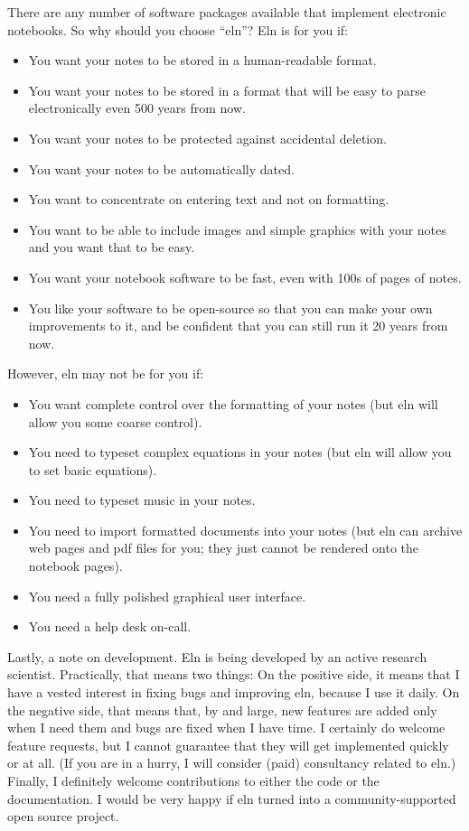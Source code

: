 \documentclass[11pt]{report}
\begin{document}
There are any
number of software packages available that implement electronic
notebooks. So why should you choose ``eln''? Eln is for you if:
\begin{itemize}
  \item You want your notes to be stored in a human-readable format.
  \item You want your notes to be stored in a format that will be easy to
    parse electronically even 500 years from now.
  \item You want your notes to be protected against accidental
    deletion.
  \item You want your notes to be automatically dated.
  \item You want to concentrate on entering text and not on
    formatting.
  \item You want to be able to include images and simple graphics with
    your notes and you want that to be easy.
  \item You want your notebook software to be fast, even with 100s
    of pages of notes.
  \item You like your software to be open-source so that you can make
    your own improvements to it, and be confident that you can still
    run it 20 years from now.
\end{itemize}
\noindent However, eln may not be for you if:
\begin{itemize}
  \item You want complete control over the formatting of your notes
    (but eln will allow you some coarse control).
  \item You need to typeset complex equations in your notes (but eln
    will allow you to set basic equations).
  \item You need to typeset music in your notes.
  \item You need to import formatted documents into your notes (but
    eln can archive web pages and pdf files for you; they just cannot
    be rendered onto the notebook pages).
  \item You need a fully polished graphical user interface.
  \item You need a help desk on-call.
\end{itemize}
\noindent Lastly, a note on development. Eln is being developed by an
active research scientist. Practically, that means two things: On the
positive side, it means that I have a vested interest in fixing bugs
and improving eln, because I use it daily. On the negative side, that
means that, by and large, new features are added only when I need them
and bugs are fixed when I have time. I certainly do welcome feature
requests, but I cannot guarantee that they will get implemented
quickly or at all. (If you are in a hurry, I will consider (paid)
consultancy related to eln.) Finally, I definitely welcome
contributions to either the code or the documentation. I would be very
happy if eln turned into a community-supported open source project.
\end{document}
